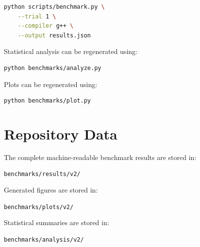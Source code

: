 \documentclass[11pt]{article}
\begin{document}
\begin{lstlisting}[language=bash]
python scripts/benchmark.py \
    --trial 1 \
    --compiler g++ \
    --output results.json
\end{lstlisting}

Statistical analysis can be regenerated using:

\begin{lstlisting}[language=bash]
python benchmarks/analyze.py
\end{lstlisting}

Plots can be regenerated using:

\begin{lstlisting}[language=bash]
python benchmarks/plot.py
\end{lstlisting}


\section{Repository Data}

The complete machine-readable benchmark results are stored in:

\begin{center}
\texttt{benchmarks/results/v2/}
\end{center}

Generated figures are stored in:

\begin{center}
\texttt{benchmarks/plots/v2/}
\end{center}

Statistical summaries are stored in:

\begin{center}
\texttt{benchmarks/analysis/v2/}
\end{center}
\end{document}
